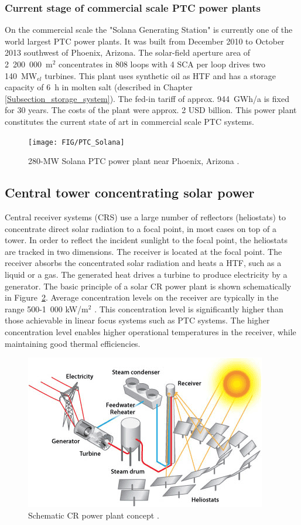 \subsubsection{Current stage of commercial scale PTC power plants}
On the commercial  scale the "Solana Generating Station" is currently one of the world largest PTC power plants. It was built from December 2010 to October 2013 southwest of Phoenix, Arizona. The solar-field aperture area of 2~200~000~m$^2$ concentrates in 808 loops with 4 SCA per loop drives two 140~MW$_{el}$ turbines. This plant uses synthetic oil as HTF and has a storage capacity of 6~h in molten salt (described in Chapter \ref{Subsection_storage_system}). The fed-in tariff of approx. 944~GWh/a is fixed for 30 years. The costs of the plant were approx. 2 USD billion. This power plant constitutes the current state of art in commercial scale PTC systems. \cite{NREL2015d}
\begin{figure}[!h] 
\centering
\texttt{[image: FIG/PTC\_Solana]}
\caption[280-MW Solana PTC power plant near Phoenix, Arizona.]{280-MW Solana PTC power plant near Phoenix, Arizona \cite{AbengoaSolar2013a}.}\label{PTC_Solana}
\end{figure}
\pagebreak
\subsection{Central tower concentrating solar power} \label{subsection_CRS}
Central receiver systems (CRS) use a large number of reflectors (heliostats) to concentrate direct solar radiation to a focal point, in most cases on top of a tower. In order to reflect the incident sunlight to the focal point, the heliostats are tracked in two dimensions. The receiver is located at the focal point. The receiver absorbs the concentrated solar radiation and heats a HTF, such as a liquid or a gas. The generated heat drives a turbine to produce electricity by a generator. The basic principle of a solar CR power plant is shown schematically in Figure~\ref{power_tower}. Average concentration levels on the receiver are typically in the range 500-1~000 kW/m$^2$ \cite{Pitz-Paal.2013}. This concentration level is significantly higher than those achievable in linear focus systems such as PTC systems. The higher concentration level enables higher operational temperatures in the receiver, while maintaining good thermal efficiencies.
\begin{figure}[!h] 
\centering
\includegraphics[width=0.6\linewidth]{FIG/power_tower}
\caption[Schematic CR power plant concept.]{Schematic CR power plant concept \cite{U.S.DOE2013}.}\label{power_tower}
\end{figure}



